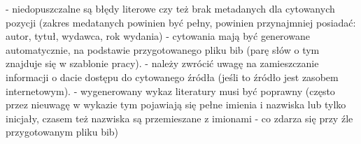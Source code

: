      - niedopuszczalne są błędy literowe czy też brak metadanych dla cytowanych pozycji (zakres medatanych powinien być pełny, powinien przynajmniej posiadać: autor, tytuł, wydawca, rok wydania)
      - cytowania mają być generowane automatycznie, na podstawie przygotowanego pliku bib (parę słów o tym znajduje się w szablonie pracy).
      - należy zwrócić uwagę na zamieszczanie informacji o dacie dostępu do cytowanego źródła (jeśli to źródło jest zasobem internetowym).
      - wygenerowany wykaz literatury musi być poprawny (często przez nieuwagę w wykazie tym pojawiają się pełne imienia i nazwiska lub tylko inicjały, czasem też nazwiska są przemieszane z imionami - co zdarza się przy źle przygotowanym pliku bib)

